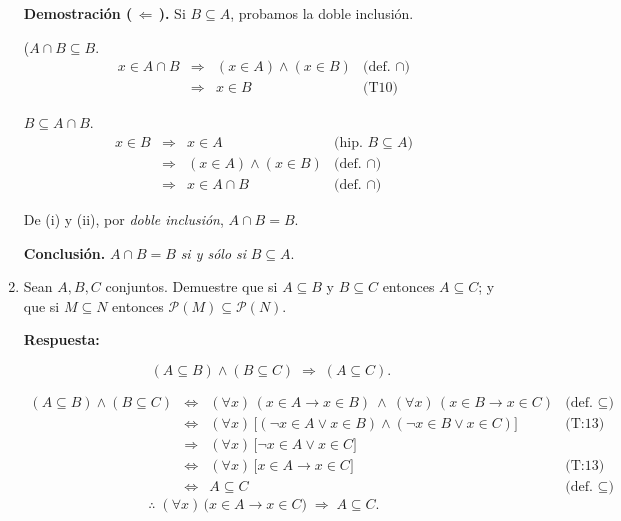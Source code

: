 \documentclass[12pt,letterpaper]{exam}
\begin{document}
\begin{enumerate}
    \textbf{Demostración (\,$\Leftarrow$\,).} Si $B\subseteq A$, probamos la doble inclusión.

    ($A\cap B\subseteq B$.
    \[
    \begin{array}{rcll}
    x\in A\cap B &\Rightarrow& (x\in A)\land(x\in B) & \text{(def.\ $\cap$)}\\[2pt]
    &\Rightarrow& x\in B & \text{(T10)}
    \end{array}
    \]

    $B\subseteq A\cap B$.
    \[
    \begin{array}{rcll}
    x\in B &\Rightarrow& x\in A & \text{(hip.\ $B\subseteq A$)}\\[2pt]
    &\Rightarrow& (x\in A)\land(x\in B) & \text{(def.\ $\cap$)}\\[2pt]
    &\Rightarrow& x\in A\cap B & \text{(def.\ $\cap$)}
    \end{array}
    \]

    De (i) y (ii), por \emph{doble inclusión}, $A\cap B = B$.

    \textbf{Conclusión.} $A\cap B=B$ \emph{si y sólo si} $B\subseteq A$.

    \item Sean $A,B,C$ conjuntos. Demuestre que si $A\subseteq B$ y $B\subseteq C$ entonces     $A\subseteq C$; y que si $M\subseteq N$ entonces $\mathcal P(M)\subseteq \mathcal P(N)$.
    
        \textbf{Respuesta:}
    

\[\quad (A\subseteq B)\land(B\subseteq C)\;\Rightarrow\; (A\subseteq C).\]


\[
\begin{array}{rcll}
(A\subseteq B)\land(B\subseteq C)
&\iff& (\forall x)\,(x\in A\to x\in B)\ \land\ (\forall x)\,(x\in B\to x\in C) & \text{(def.\ }\subseteq\text{)}\\[4pt]
&\iff& (\forall x)\,\big[(\neg x\in A\lor x\in B)\land(\neg x\in B\lor x\in C)\big] & \text{(T:13)}\\[4pt]
&\Rightarrow& (\forall x)\,\big[\neg x\in A\lor x\in C\big] & \\[4pt]
&\iff& (\forall x)\,\big[x\in A\to x\in C\big] & \text{(T:13)}\\[4pt]
&\iff& A\subseteq C & \text{(def.\ }\subseteq\text{)}
\end{array}
\]
\[
\therefore\; (\forall x)\,\big(x\in A\to x\in C\big)\;\Rightarrow\; A\subseteq C.
\]


\end{enumerate}
\end{document}
